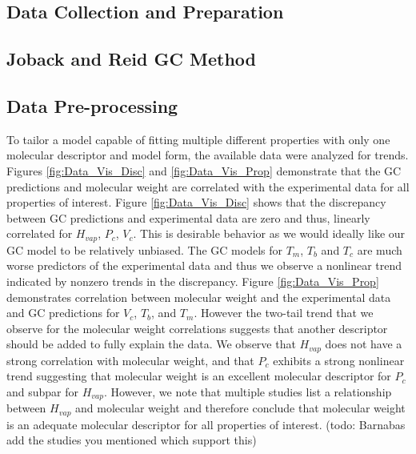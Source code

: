 \documentclass[journal=jacsat,manuscript=article]{achemso}
\begin{document}
\subsection{Data Collection and Preparation}
\subsection{Joback and Reid GC Method}
\subsection{Data Pre-processing} \label{sec:preprocess}
To tailor a model capable of fitting multiple different properties with only one molecular descriptor and model form, the available data were analyzed for trends. Figures \ref{fig:Data_Vis_Disc} and \ref{fig:Data_Vis_Prop} demonstrate that the GC predictions and molecular weight are correlated with the experimental data for all properties of interest. Figure \ref{fig:Data_Vis_Disc} shows that the discrepancy between GC predictions and experimental data are zero and thus, linearly correlated for $H_{vap}$, $P_c$, $V_c$. This is desirable behavior as we would ideally like our GC model to be relatively unbiased. The GC models for $T_m$, $T_b$ and $T_c$ are much worse predictors of the experimental data and thus we observe a nonlinear trend indicated by nonzero trends in the discrepancy. Figure \ref{fig:Data_Vis_Prop} demonstrates correlation between molecular weight and the experimental data and GC predictions for $V_c$, $T_b$, and $T_m$. However the two-tail trend that we observe for the molecular weight correlations suggests that another descriptor should be added to fully explain the data. We observe that $H_{vap}$ does not have a strong correlation with molecular weight, and that $P_c$ exhibits a strong nonlinear trend suggesting that molecular weight is an excellent molecular descriptor for $P_c$ and subpar for $H_{vap}$. However, we note that multiple studies list a relationship between $H_{vap}$ and molecular weight and therefore conclude that molecular weight is an adequate molecular descriptor for all properties of interest. (todo: Barnabas add the studies you mentioned which support this)
\end{document}
